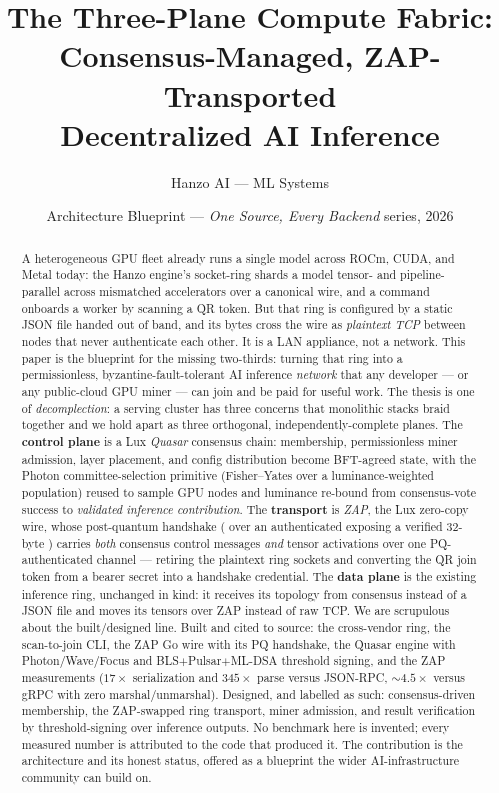 \documentclass[11pt]{article}
\title{\textbf{The Three-Plane Compute Fabric:\\
Consensus-Managed, ZAP-Transported\\ Decentralized AI Inference}}
\author{Hanzo AI --- ML Systems}
\date{Architecture Blueprint --- \emph{One Source, Every Backend} series, 2026}
\begin{document}
\maketitle

\begin{abstract}
A heterogeneous GPU fleet already runs a single model across ROCm, CUDA, and Metal
today: the Hanzo engine's socket-ring shards a model tensor- and pipeline-parallel across
mismatched accelerators over a canonical  wire, and a 
command onboards a worker by scanning a QR token. But that ring is configured by a static
JSON file handed out of band, and its bytes cross the wire as \emph{plaintext TCP} between
nodes that never authenticate each other. It is a LAN appliance, not a network. This paper
is the blueprint for the missing two-thirds: turning that ring into a permissionless,
byzantine-fault-tolerant AI inference \emph{network} that any developer --- or any
public-cloud GPU miner --- can join and be paid for useful work. The thesis is one of
\emph{decomplection}: a serving cluster has three concerns that monolithic stacks braid
together and we hold apart as three orthogonal, independently-complete planes. The
\textbf{control plane} is a Lux \emph{Quasar} consensus chain: membership, permissionless
miner admission, layer placement, and config distribution become BFT-agreed state, with the
Photon committee-selection primitive (Fisher--Yates over a luminance-weighted population)
reused to sample GPU nodes and luminance re-bound from consensus-vote success to
\emph{validated inference contribution}. The \textbf{transport} is \emph{ZAP}, the Lux
zero-copy wire, whose post-quantum handshake ( over an authenticated
 exposing a verified 32-byte ) carries \emph{both} consensus
control messages \emph{and} tensor activations over one PQ-authenticated channel --- retiring
the plaintext ring sockets and converting the QR join token from a bearer secret into a
handshake credential. The \textbf{data plane} is the existing inference ring, unchanged in
kind: it receives its topology from consensus instead of a JSON file and moves its tensors
over ZAP instead of raw TCP. We are scrupulous about the built/designed line. Built and
cited to source: the cross-vendor ring, the  scan-to-join CLI, the ZAP
Go wire with its PQ handshake, the Quasar engine with Photon/Wave/Focus and BLS$+$Pulsar$+$ML-DSA
threshold signing, and the ZAP measurements ($17\times$ serialization and $345\times$ parse
versus JSON-RPC, $\sim$$4.5\times$ versus gRPC with zero marshal/unmarshal). Designed, and
labelled as such: consensus-driven membership, the ZAP-swapped ring transport, miner
admission, and result verification by threshold-signing over inference outputs. No benchmark
here is invented; every measured number is attributed to the code that produced it. The
contribution is the architecture and its honest status, offered as a blueprint the wider
AI-infrastructure community can build on.
\end{abstract}
\end{document}
